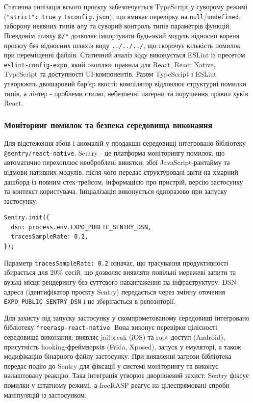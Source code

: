 Статична типізація всього проєкту забезпечується TypeScript у суворому режимі (\texttt{"strict": true} у \texttt{tsconfig.json}), що вмикає перевірку на \texttt{null}/\texttt{undefined}, заборону неявних типів \texttt{any} та суворий контроль типів параметрів функцій. Псевдонім шляху \texttt{@/*} дозволяє імпортувати будь-який модуль відносно кореня проєкту без відносних шляхів виду \texttt{../../../}, що скорочує кількість помилок при переміщенні файлів. Статичний аналіз коду виконується ESLint із пресетом \texttt{eslint-config-expo}, який охоплює правила для React, React Native, TypeScript та доступності \gls{UI}-компонентів. Разом TypeScript і ESLint утворюють двошаровий бар'єр якості: компілятор відловлює структурні помилки типів, а лінтер - проблеми стилю, небезпечні патерни та порушення правил хуків React.

\subsubsection{Моніторинг помилок та безпека середовища виконання}

Для відстеження збоїв і аномалій у продакшн-середовищі інтегровано бібліотеку \texttt{@sentry/react-native}. Sentry - це платформа моніторингу помилок, що автоматично перехоплює необроблені винятки, збої JavaScript-рантайму та відмови нативних модулів, після чого передає структуровані звіти на хмарний дашборд із повним стек-трейсом, інформацією про пристрій, версію застосунку та контекст користувача. Ініціалізація виконується одноразово при запуску застосунку:

\begin{verbatim}
Sentry.init({
  dsn: process.env.EXPO_PUBLIC_SENTRY_DSN,
  tracesSampleRate: 0.2,
});
\end{verbatim}

Параметр \texttt{tracesSampleRate: 0.2} означає, що трасування продуктивності збирається для 20\% сесій, що дозволяє виявляти повільні мережеві запити та вузькі місця рендерингу без суттєвого навантаження на інфраструктуру. DSN-адреса (ідентифікатор проєкту Sentry) передається через змінну оточення \texttt{EXPO\_PUBLIC\_SENTRY\_DSN} і не зберігається в репозиторії.

Для захисту від запуску застосунку у скомпрометованому середовищі інтегровано бібліотеку \texttt{freerasp-react-native}. Вона виконує перевірки цілісності середовища виконання: виявляє jailbreak (iOS) та root-доступ (Android), присутність hooking-фреймворків (Frida, Xposed), запуск у емуляторі, а також модифікацію бінарного файлу застосунку. При виявленні загрози бібліотека передає подію до Sentry для фіксації у системі моніторингу та виконує налаштовану реакцію. Така інтеграція утворює дворівневий захист: Sentry фіксує помилки у штатному режимі, а freeRASP реагує на цілеспрямовані спроби маніпуляцій із застосунком.

